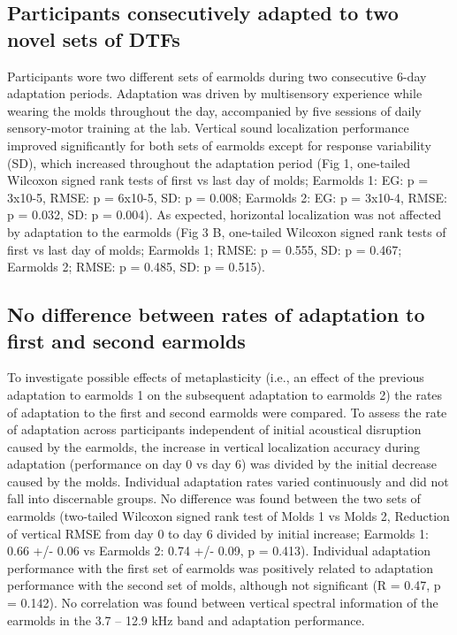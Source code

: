  \subsection{Participants consecutively adapted to two novel sets of DTFs}
 
Participants wore two different sets of earmolds during two consecutive 6-day adaptation periods. Adaptation was driven by multisensory experience while wearing the molds throughout the day, accompanied by five sessions of daily sensory-motor training at the lab. Vertical sound localization performance improved significantly for both sets of earmolds except for response variability (SD), which increased throughout the adaptation period (Fig 1, one-tailed Wilcoxon signed rank tests of first vs last day of molds; Earmolds 1: EG: p = 3x10-5, RMSE: p = 6x10-5, SD: p = 0.008; Earmolds 2: EG: p = 3x10-4, RMSE: p = 0.032, SD: p = 0.004). As expected, horizontal localization was not affected by adaptation to the earmolds (Fig 3 B, one-tailed Wilcoxon signed rank tests of first vs last day of molds; Earmolds 1; RMSE: p = 0.555, SD: p = 0.467; Earmolds 2; RMSE: p = 0.485, SD: p = 0.515).

\subsection{No difference between rates of adaptation to first and second earmolds}

To investigate possible effects of metaplasticity (i.e., an effect of the previous adaptation to earmolds 1 on the subsequent adaptation to earmolds 2) the rates of adaptation to the first and second earmolds were compared. To assess the rate of adaptation across participants independent of initial acoustical disruption caused by the earmolds, the increase in vertical localization accuracy during adaptation (performance on day 0 vs day 6) was divided by the initial decrease caused by the molds. Individual adaptation rates varied continuously and did not fall into discernable groups. No difference was found between the two sets of earmolds (two-tailed Wilcoxon signed rank test of Molds 1 vs Molds 2, Reduction of vertical RMSE from day 0 to day 6 divided by initial increase; Earmolds 1: 0.66 +/- 0.06 vs Earmolds 2:  0.74 +/- 0.09, p = 0.413). Individual adaptation performance with the first set of earmolds was positively related to adaptation performance with the second set of molds, although not significant (R = 0.47, p = 0.142). No correlation was found between vertical spectral information of the earmolds in the 3.7 – 12.9 kHz band and adaptation performance.

